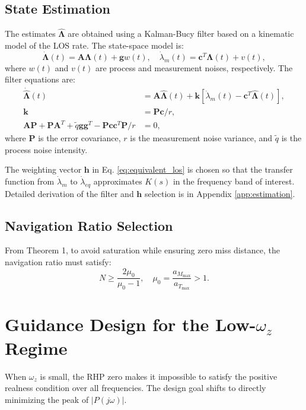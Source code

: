 \documentclass[11pt,a4paper]{article}
\begin{document}
\subsection{State Estimation}
The estimates $\hat{\bm{\Lambda}}$ are obtained using a Kalman-Bucy filter based on a kinematic model of the LOS rate. The state-space model is:
\begin{equation}
\dot{\bm{\Lambda}}(t) = \mathbf{A} \bm{\Lambda}(t) + \mathbf{g} w(t), \quad \dot{\lambda}_m(t) = \mathbf{c}^T \bm{\Lambda}(t) + v(t),
\label{eq:state_space_model}
\end{equation}
where $w(t)$ and $v(t)$ are process and measurement noises, respectively. The filter equations are:
\begin{align}
\dot{\hat{\bm{\Lambda}}}(t) &= \mathbf{A} \hat{\bm{\Lambda}}(t) + \mathbf{k}[\dot{\lambda}_m(t) - \mathbf{c}^T \hat{\bm{\Lambda}}(t)], \\
\mathbf{k} &= \mathbf{P} \mathbf{c} / r, \\
\mathbf{A}\mathbf{P} + \mathbf{P}\mathbf{A}^T + \tilde{q}\mathbf{g}\mathbf{g}^T - \mathbf{P}\mathbf{c}\mathbf{c}^T\mathbf{P}/r &= 0,
\label{eq:kalman_filter}
\end{align}
where $\mathbf{P}$ is the error covariance, $r$ is the measurement noise variance, and $\tilde{q}$ is the process noise intensity.

The weighting vector $\mathbf{h}$ in Eq. \eqref{eq:equivalent_los} is chosen so that the transfer function from $\dot{\lambda}_m$ to $\dot{\lambda}_{eq}$ approximates $K(s)$ in the frequency band of interest. Detailed derivation of the filter and $\mathbf{h}$ selection is in Appendix \ref{app:estimation}.

\subsection{Navigation Ratio Selection}
From Theorem 1, to avoid saturation while ensuring zero miss distance, the navigation ratio must satisfy:
\begin{equation}
N \geq \frac{2\mu_0}{\mu_0 - 1}, \quad \mu_0 = \frac{a_{M_{\max}}}{a_{T_{\max}}} > 1.
\label{eq:N_selection}
\end{equation}

\section{Guidance Design for the Low-$\omega_z$ Regime}
\label{sec:design_lowwz}
When $\omega_z$ is small, the RHP zero makes it impossible to satisfy the positive realness condition over all frequencies. The design goal shifts to directly minimizing the peak of $|P(j\omega)|$.
\end{document}
